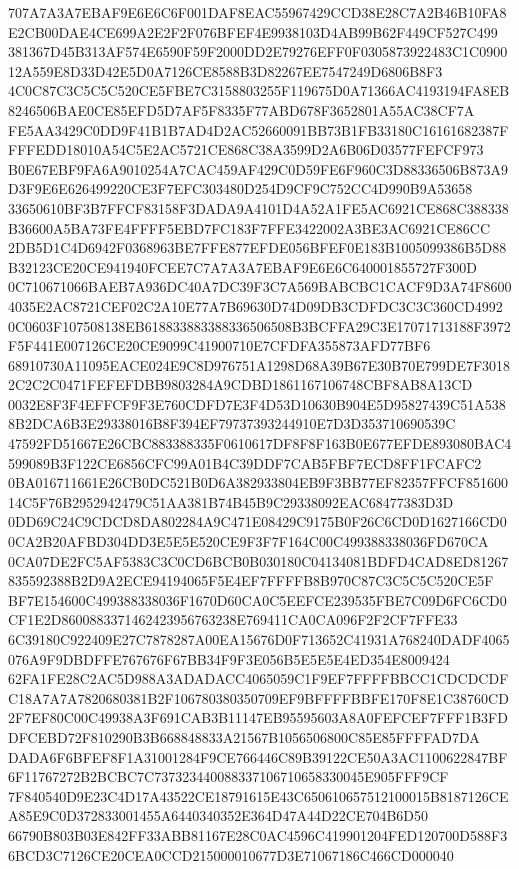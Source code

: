\documentclass[UTF8,fontset=fandol,zihao=-4,a4paper]{ctexart}
\begin{document}
{{707A7A3A7EBAF9E6E6C6F001DAF8EAC55967429CCD38E28C7A2B46B10FA8E2CB00DAE4CE699A2E2F2F076BFEF4E9938103D4AB99B62F449CF527C499
381367D45B313AF574E6590F59F2000DD2E79276EFF0F0305873922483C1C090012A559E8D33D42E5D0A7126CE8588B3D82267EE7547249D6806B8F3
4C0C87C3C5C5C520CE5FBE7C3158803255F119675D0A71366AC4193194FA8EB8246506BAE0CE85EFD5D7AF5F8335F77ABD678F3652801A55AC38CF7A
FE5AA3429C0DD9F41B1B7AD4D2AC52660091BB73B1FB33180C16161682387FFFFEDD18010A54C5E2AC5721CE868C38A3599D2A6B06D03577FEFCF973
B0E67EBF9FA6A9010254A7CAC459AF429C0D59FE6F960C3D88336506B873A9D3F9E6E626499220CE3F7EFC303480D254D9CF9C752CC4D990B9A53658
33650610BF3B7FFCF83158F3DADA9A4101D4A52A1FE5AC6921CE868C388338B36600A5BA73FE4FFFF5EBD7FC183F7FFE3422002A3BE3AC6921CE86CC
2DB5D1C4D6942F0368963BE7FFE877EFDE056BFEF0E183B1005099386B5D88B32123CE20CE941940FCEE7C7A7A3A7EBAF9E6E6C640001855727F300D
0C710671066BAEB7A936DC40A7DC39F3C7A569BABCBC1CACF9D3A74F86004035E2AC8721CEF02C2A10E77A7B69630D74D09DB3CDFDC3C3C360CD4992
0C0603F107508138EB618833883388336506508B3BCFFA29C3E17071713188F3972F5F441E007126CE20CE9099C41900710E7CFDFA355873AFD77BF6
68910730A11095EACE024E9C8D976751A1298D68A39B67E30B70E799DE7F30182C2C2C0471FEFEFDBB9803284A9CDBD1861167106748CBF8AB8A13CD
0032E8F3F4EFFCF9F3E760CDFD7E3F4D53D10630B904E5D95827439C51A5388B2DCA6B3E29338016B8F394EF79737393244910E7D3D353710690539C
47592FD51667E26CBC883388335F0610617DF8F8F163B0E677EFDE893080BAC4599089B3F122CE6856CFC99A01B4C39DDF7CAB5FBF7ECD8FF1FCAFC2
0BA016711661E26CB0DC521B0D6A382933804EB9F3BB77EF82357FFCF85160014C5F76B2952942479C51AA381B74B45B9C29338092EAC68477383D3D
0DD69C24C9CDCD8DA802284A9C471E08429C9175B0F26C6CD0D1627166CD00CA2B20AFBD304DD3E5E5E520CE9F3F7F164C00C499388338036FD670CA
0CA07DE2FC5AF5383C3C0CD6BCB0B030180C04134081BDFD4CAD8ED81267835592388B2D9A2ECE94194065F5E4EF7FFFFB8B970C87C3C5C5C520CE5F
BF7E154600C499388338036F1670D60CA0C5EEFCE239535FBE7C09D6FC6CD0CF1E2D8600883371462423956763238E769411CA0CA096F2F2CF7FFE33
6C39180C922409E27C7878287A00EA15676D0F713652C41931A768240DADF4065076A9F9DBDFFE767676F67BB34F9F3E056B5E5E5E4ED354E8009424
62FA1FE28C2AC5D988A3ADADACC4065059C1F9EF7FFFFBBCC1CDCDCDFC18A7A7A7820680381B2F106780380350709EF9BFFFFBBFE170F8E1C38760CD
2F7EF80C00C49938A3F691CAB3B11147EB95595603A8A0FEFCEF7FFF1B3FDDFCEBD72F810290B3B668848833A21567B1056506800C85E85FFFFAD7DA
DADA6F6BFEF8F1A31001284F9CE766446C89B39122CE50A3AC1100622847BF6F11767272B2BCBC7C737323440088337106710658330045E905FFF9CF
7F840540D9E23C4D17A43522CE18791615E43C650610657512100015B8187126CEA85E9C0D372833001455A6440340352E364D47A44D22CE704B6D50
66790B803B03E842FF33ABB81167E28C0AC4596C419901204FED120700D588F36BCD3C7126CE20CEA0CCD215000010677D3E71067186C466CD000040
}}
\end{document}
